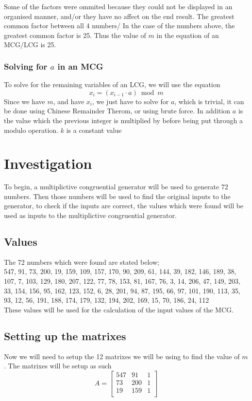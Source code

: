 \documentclass[12pft, english]{article}
\begin{document}
\begin{multicols}{2}
  Some of the factors were ommited because they could not be displayed in an organised manner, and/or they have no affect on the end result. The greatest common factor between all 4 numbers/
  In the case of the numbers above, the greatest common factor is 25. Thus the value of \(m\) in the equation of an MCG/LCG is 25.

  \subsubsection{Solving for \(a\) in an MCG}
  To solve for the remaining variables of an LCG, we will use the equation
  \[ x_{i} = (x_{i-1} \cdot a ) \bmod m\]
  Since we have \(m\), and have \(x_{i}\), we just have to solve for \(a\), which is trivial, it can be done using Chinese Remainder Therom, or using brute force.  In addition \(a\) is the value which the previous integer is multiplied by before being put through a modulo operation. \(k\) is a constant value

  \section{Investigation}
  To begin, a multiplictive congruential generator will be used to generate 72 numbers. Then those numbers will be used to find the original inputs to the generator, to check if the inputs are correct, the values which were found will be used as inputs to the multiplictive congruential generator.
  \subsection{Values}
  The 72 numbers which were found are stated below; \\
  547, 91, 73, 200, 19, 159, 109, 157, 170, 90, 209, 61, 144, 39, 182, 146, 189, 38, 107, 7, 103, 129, 180, 207, 122, 77, 78, 153, 81, 167, 76, 3, 14, 206, 47, 149, 203, 33, 154, 156, 95, 162, 123, 152, 6, 28, 201, 94, 87, 195, 66, 97, 101, 190, 113, 35, 93, 12, 56, 191, 188, 174, 179, 132, 194, 202, 169, 15, 70, 186, 24, 112 \\
  These values will be used for the calculation of the input values of the MCG.
  \subsection{Setting up the matrixes}
  Now we will need to setup the 12 matrixes we will be using to find the value of \(m\). The matrixes will be setup as such
  \[
    A =
    \begin{bmatrix}
      547 & 91  & 1 \\
      73  & 200 & 1 \\
      19  & 159 & 1\\
    \end{bmatrix}
  \]


\end{multicols}
\end{document}
